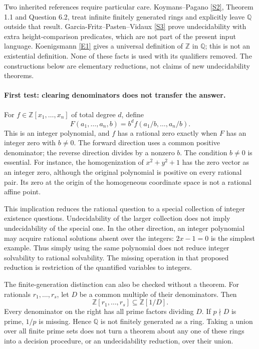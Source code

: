 \documentclass[11pt]{article}
\begin{document}
Two inherited references require particular care. Koymans--Pagano \href{https://arxiv.org/html/2602.04468v1}{[S2]},
Theorem 1.1 and Question 6.2, treat infinite finitely generated rings and
explicitly leave $\mathbb Q$ outside that result. Garcia-Fritz--Pasten--Vidaux
\href{https://arxiv.org/abs/2311.01958}{[S3]} prove undecidability with extra height-comparison predicates, which are
not part of the present input language. Koenigsmann \href{https://arxiv.org/abs/1011.3424}{[E1]} gives a universal
definition of $\mathbb Z$ in $\mathbb Q$; this is not an existential definition.
None of these facts is used with its qualifiers removed. The constructions
below are elementary reductions, not claims of new undecidability theorems.

\paragraph{First test: clearing denominators does not transfer the answer.}
For $f\in\mathbb Z[x_1,\ldots,x_n]$ of total degree $d$, define
\[
 F(a_1,\ldots,a_n,b)=b^df(a_1/b,\ldots,a_n/b).
\]
This is an integer polynomial, and $f$ has a rational zero exactly when
$F$ has an integer zero with $b\ne0$. The forward direction uses a common
positive denominator; the reverse direction divides by a nonzero $b$.
The condition $b\ne0$ is essential. For instance, the homogenization of
$x^2+y^2+1$ has the zero vector as an integer zero, although the original
polynomial is positive on every rational pair. Its zero at the origin of
the homogeneous coordinate space is not a rational affine point.

This implication reduces the rational question to a special collection
of integer existence questions. Undecidability of the larger collection
does not imply undecidability of the special one. In the other direction,
an integer polynomial may acquire rational solutions absent over the
integers: $2x-1=0$ is the simplest example. Thus simply using the same
polynomial does not reduce integer solvability to rational solvability.
The missing operation in that proposed reduction is restriction of the
quantified variables to integers.

The finite-generation distinction can also be checked without a theorem.
For rationals $r_1,\ldots,r_s$, let $D$ be a common multiple of their
denominators. Then
\[
 \mathbb Z[r_1,\ldots,r_s]\subseteq\mathbb Z[1/D].
\]
Every denominator on the right has all prime factors dividing $D$.
If $p\nmid D$ is prime, $1/p$ is missing. Hence $\mathbb Q$ is not
finitely generated as a ring. Taking a union over all finite prime sets
does not turn a theorem about any one of these rings into a decision
procedure, or an undecidability reduction, over their union.
\end{document}
